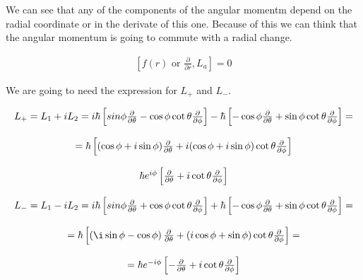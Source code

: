 We can see that any of the components of the angular momentm depend on the radial coordinate or in the derivate of this one. Because of this we can think that the angular momentum is going to commute with a radial change.

\begin{equation}
  \begin{array}{c}
    [f(r) \text{ or } \frac{\partial}{\partial r},L_a] = 0
  \end{array}
\end{equation}

We are going to need the expression for $L_+$ and $L_-$.

\begin{equation}
  \begin{array}{c}
    L_+ = L_1 + iL_2 = i\hbar\left[sin\phi\frac{\partial}{\partial\theta}-\cos\phi\cot\theta\frac{\partial}{\partial\phi}\right] - \hbar\left[-\cos\phi\frac{\partial}{\partial\theta}+\sin\phi\cot\theta\frac{\partial}{\partial\phi}\right] =
    \\

    \\
    = \hbar\left[(\cos\phi+i\sin\phi)\frac{\partial}{\partial\theta}+i(\cos\phi+i\sin\phi)\cot\theta\frac{\partial}{\partial\phi}\right]
    \\

    \\
    \hbar e^{i\phi}\left[\frac{\partial}{\partial\theta}+i\cot\theta\frac{\partial}{\partial\phi}\right]
    \\

    \\
    L_- = L_1 - iL_2 = i\hbar\left[sin\phi\frac{\partial}{\partial\theta}+\cos\phi\cot\theta\frac{\partial}{\partial\phi}\right] + \hbar\left[-\cos\phi\frac{\partial}{\partial\theta}+\sin\phi\cot\theta\frac{\partial}{\partial\phi}\right] =
    \\

    \\
    = \hbar\left[\left(\i\sin\phi-\cos\phi\right)\frac{\partial}{\partial \theta}+\left(i\cos\phi+\sin\phi\right)\cot\theta\frac{\partial}{\partial\phi}\right] =
    \\

    \\
    = \hbar e^{-i\phi}\left[-\frac{\partial}{\partial\theta}+i\cot\theta\frac{\partial}{\partial\phi}\right]
  \end{array}
\end{equation}

